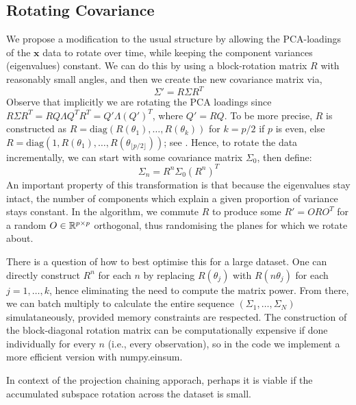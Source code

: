 \subsection{Rotating Covariance}\label{sec:rotcov}
We propose a modification to the usual structure by allowing the PCA-loadings of the $\bm{x}$ data to rotate over time, while keeping the component variances (eigenvalues) constant. We can do this by using a block-rotation matrix $R$ with reasonably small angles, and then we create the new covariance matrix via,
\[
\Sigma' = R\Sigma R^T    
\]
Observe that implicitly we are rotating the PCA loadings since $R\Sigma R^T = RQ\Lambda Q^TR^T = Q'\Lambda (Q')^T$, where $Q' = RQ$. To be more precise, $R$ is constructed as $R=\mathrm{diag}(R(\theta_1),\dots, R(\theta_k))$ for $k=p/2$ if $p$ is even, else $R = \mathrm{diag}(1, R(\theta_1), \dots, R(\theta_{\lfloor p/2 \rfloor}))$; see \cite{386513}. Hence, to rotate the data incrementally, we can start with some covariance matrix $\Sigma_0$, then define:
\[\Sigma_n = R^n \Sigma_0 (R^n)^T\]
An important property of this transformation is that because the eigenvalues stay intact, the number of components which explain a given proportion of variance stays constant. In the algorithm, we commute $R$ to produce some $R' = ORO^T$ for a random $O\in \mathbb{R}^{p \times p}$ orthogonal, thus randomising the planes for which we rotate about. 

There is a question of how to best optimise this for a large dataset. One can directly construct $R^n$ for each $n$ by replacing $R(\theta_j)$ with $R(n \theta_j)$ for each $j=1,\dots,k$, hence eliminating the need to compute the matrix power. From there, we can batch multiply to calculate the entire sequence $(\Sigma_1,\dots, \Sigma_N)$ simulataneously, provided memory constraints are respected. The construction of the block-diagonal rotation matrix can be computationally expensive if done individually for every $n$ (i.e., every observation), so in the code we implement a more efficient version with numpy.einsum.

In context of the projection chaining apporach, perhaps it is viable if the accumulated subspace rotation across the dataset is small.